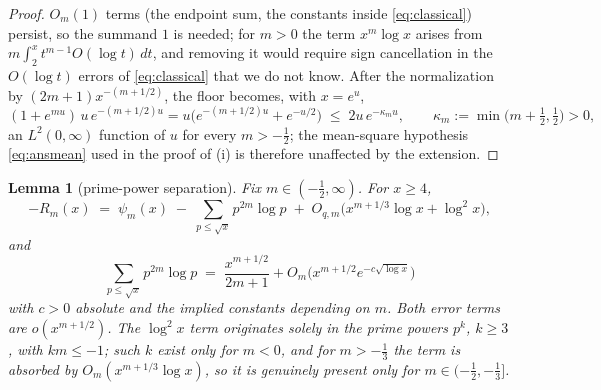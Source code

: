 \documentclass[11pt]{article}
\newtheorem{lemma}{Lemma}
\begin{document}
\begin{proof}
$O_m(1)$ terms (the endpoint sum, the constants inside
\eqref{eq:classical}) persist, so the summand $1$ is needed; for $m>0$
the term $x^m\log x$ arises from $m\int_2^xt^{m-1}O(\log t)\,dt$, and
removing it would require sign cancellation in the $O(\log t)$ errors
of \eqref{eq:classical} that we do not know. After the normalization by
$(2m+1)x^{-(m+1/2)}$, the floor becomes, with $x=e^u$,
\[
(1+e^{mu})\,u\,e^{-(m+1/2)u}
=u\bigl(e^{-(m+1/2)u}+e^{-u/2}\bigr)
\;\le\;2u\,e^{-\kappa_m u},
\qquad
\kappa_m:=\min\bigl(m+\tfrac12,\tfrac12\bigr)>0,
\]
an $L^2(0,\infty)$ function of $u$ for every $m>-\tfrac12$; the
mean-square hypothesis \eqref{eq:ansmean} used in the proof of (i) is
therefore unaffected by the extension.
\end{proof}

\begin{lemma}[prime-power separation]\label{lem:squares}
Fix $m\in(-\tfrac12,\infty)$. For $x\ge4$,
\[
-R_m(x)\;=\;\psi_m(x)\;-\;\sum_{p\le\sqrt x}p^{2m}\log p
\;+\;O_{q,m}\!\bigl(x^{m+1/3}\log x+\log^2x\bigr),
\]
and
\[
\sum_{p\le\sqrt x}p^{2m}\log p\;=\;\frac{x^{m+1/2}}{2m+1}
+O_m\!\bigl(x^{m+1/2}e^{-c\sqrt{\log x}}\bigr)
\]
with $c>0$ absolute and the implied constants depending on $m$. Both
error terms are $o(x^{m+1/2})$. The $\log^2x$ term originates solely in
the prime powers $p^k$, $k\ge3$, with $km\le-1$; such $k$ exist only
for $m<0$, and for $m>-\tfrac13$ the term is absorbed by
$O_m(x^{m+1/3}\log x)$, so it is genuinely present only for
$m\in(-\tfrac12,-\tfrac13]$.
\end{lemma}
\end{document}
